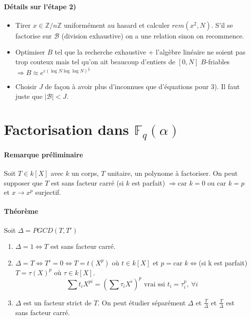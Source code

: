 \documentclass[12pt,a4paper]{report}
\begin{document}
\paragraph{Détails sur l'étape 2)}
\begin{itemize}
\item Tirer $x \in \mathbb{Z}/n\mathbb{Z}$ uniformément au hasard et calculer $rem(x^2,N)$. S'il se factorise sur $\mathcal{B}$ (division exhaustive) on a une relation sinon on recommence.
\item Optimiser $B$ tel que la recherche exhaustive + l'algèbre linéaire ne soient pas trop couteux mais tel qu'on ait beaucoup d'entiers de $[0,N]$ $B$-friables $\Rightarrow B \approx e^{c(\log N \log \log N)^{\frac{1}{2}}} $
\item Choisir $J$ de façon à avoir plus d'inconnues que d'équations pour 3). Il faut juste que $|\mathcal{B}| < J$.
\end{itemize}
\section{Factorisation dans $\mathbb{F}_q(\alpha)$}
\paragraph{Remarque préliminaire\\}
Soit $T \in k[X]$ avec $k$ un corps, $T$ unitaire, un polynome à factoriser. On peut supposer que $T$ est sans facteur carré (si $k$ est parfait) $\Rightarrow \mbox{car }k=0$ ou $\mbox{car }k=p$ et $x \rightarrow x^p$ surjectif.
\paragraph{Théorème\\}
Soit $\Delta = PGCD(T,T')$
\begin{enumerate}
\item $\Delta = 1 \Leftrightarrow T $ est sans facteur carré.
\item $ \Delta = T \Leftrightarrow T'=0 \Leftrightarrow T=t(X^p)$ où $t\in k[X]$ et $p=\mbox{car }k \Leftrightarrow $(si k est parfait) $ T = \tau(X)^p$ où $\tau \in k[X]$.
$$ \sum t_iX^{pi} = \left(\sum \tau_i X^i\right)^p \mbox{ vrai ssi } t_i =\tau_i^p, \ \forall i $$
\item $\Delta$ est un facteur strict de $T$. On peut étudier séparément $\Delta $ et $\frac{T}{\Delta}$ et $\frac{T}{\Delta}$ est sans facteur carré.
\end{enumerate}
\end{document}
